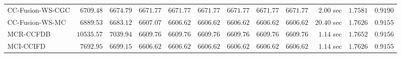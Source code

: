 \begin{table}[H]
\begin{tabular}{lrrrrrrrrrrr}
    CC-Fusion-WS-CGC & $      6709.48$ & $      6674.79$ & $      6671.77$ & $      6671.77$ & $      6671.77$ & $      6671.77$ & $      6671.77$ & $      6671.77$ & $         2.00$ sec    & $       1.7581$  & $       0.9190$ \\ 
     CC-Fusion-WS-MC & $      6889.53$ & $      6683.12$ & $      6607.07$ & $      6606.62$ & $      6606.62$ & $      6606.62$ & $      6606.62$ & $      6606.62$ & $        20.40$ sec    & $       1.7626$  & $       0.9155$ \\ 
\cmidrule{1-1} 
           MCR-CCFDB & $     10535.57$ & $      7039.94$ & $      6609.76$ & $      6609.76$ & $      6609.76$ & $      6609.76$ & $      6609.76$ & $      6609.76$ & $         1.14$ sec    & $       1.7652$  & $       0.9156$ \\ 
\cmidrule{1-1} 
           MCI-CCIFD & $      7692.95$ & $      6699.15$ & $      6606.62$ & $      6606.62$ & $      6606.62$ & $      6606.62$ & $      6606.62$ & $      6606.62$ & $         1.14$ sec    & $       1.7626$  & $       0.9155$ \\ 
\bottomrule
\end{tabular}
\end{table}

